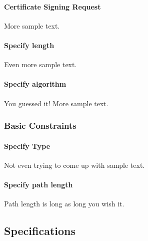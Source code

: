 \documentclass[10pt, a4paper]{report}
\begin{document}
\paragraph{Certificate Signing Request}
More sample text.

\paragraph{Specify length}
Even more sample text.

\paragraph{Specify algorithm}
You guessed it! More sample text.


\subsubsection{Basic Constraints}

\paragraph{Specify Type}
Not even trying to come up with sample text.

\paragraph{Specify path length}
Path length is long as long you wish it.


\subsection{Specifications}
\end{document}
